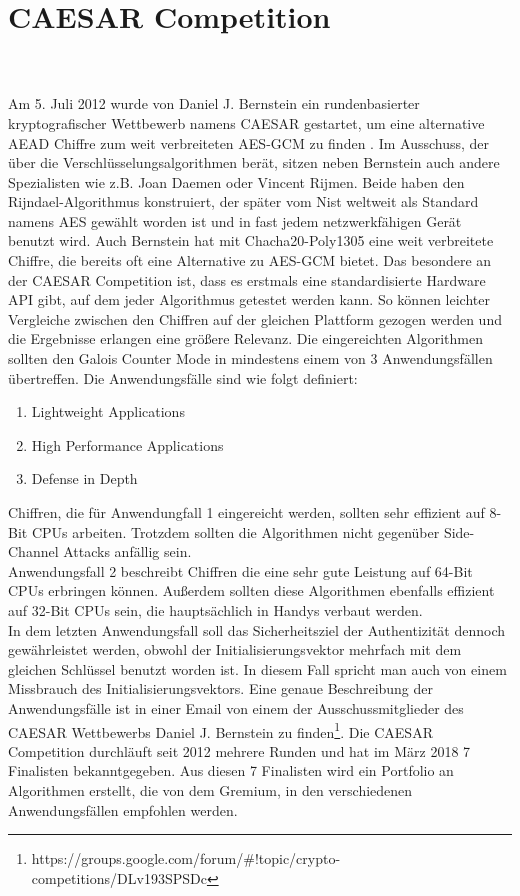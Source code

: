 \section{CAESAR Competition}\\
\\
Am 5. Juli 2012 wurde von Daniel J. Bernstein ein rundenbasierter kryptografischer Wettbewerb namens \gls{CAESAR} gestartet, um eine alternative AEAD Chiffre zum weit verbreiteten \gls{AES-GCM} zu finden \cite{bernstein2014caesar}. Im Ausschuss, der über die Verschlüsselungsalgorithmen berät, sitzen neben Bernstein auch andere Spezialisten wie z.B. Joan Daemen oder Vincent Rijmen. Beide haben den Rijndael-Algorithmus konstruiert, der später vom Nist weltweit als Standard namens \gls{AES} gewählt worden ist und in fast jedem netzwerkfähigen Gerät benutzt wird. Auch Bernstein hat mit Chacha20-Poly1305 eine weit verbreitete Chiffre, die bereits oft eine Alternative zu AES-GCM bietet. Das besondere an der CAESAR Competition ist, dass es erstmals eine standardisierte Hardware API gibt, auf dem jeder Algorithmus getestet werden kann. So können leichter Vergleiche zwischen den Chiffren auf der gleichen Plattform gezogen werden und die Ergebnisse erlangen eine größere Relevanz.
Die eingereichten Algorithmen sollten den Galois Counter Mode in mindestens einem von 3 Anwendungsfällen übertreffen.
Die Anwendungsfälle sind wie folgt definiert: 
\begin{enumerate}
\item Lightweight Applications 
\item High Performance Applications
\item Defense in Depth
\end{enumerate}
Chiffren, die für Anwendungfall 1 eingereicht werden, sollten sehr effizient auf 8-Bit \glspl{CPU} arbeiten. Trotzdem sollten die Algorithmen nicht gegenüber Side-Channel Attacks anfällig sein.\\
Anwendungsfall 2 beschreibt Chiffren die eine sehr gute Leistung auf 64-Bit \gls{CPU}s erbringen können. Außerdem sollten diese Algorithmen ebenfalls effizient auf 32-Bit CPUs sein, die hauptsächlich in Handys verbaut werden.\\
In dem letzten Anwendungsfall soll das Sicherheitsziel der Authentizität dennoch gewährleistet werden, obwohl der Initialisierungsvektor mehrfach mit dem gleichen Schlüssel benutzt worden ist. In diesem Fall spricht man auch von einem Missbrauch des Initialisierungsvektors.
Eine genaue Beschreibung der Anwendungsfälle ist in einer Email von einem der Ausschussmitglieder des \gls{CAESAR} Wettbewerbs Daniel J. Bernstein zu finden\footnote[1]{https://groups.google.com/forum/#!topic/crypto-competitions/DLv193SPSDc}.
Die \gls{CAESAR} Competition durchläuft seit 2012 mehrere Runden und hat im März 2018 7 Finalisten bekanntgegeben. Aus diesen 7 Finalisten wird ein Portfolio an Algorithmen erstellt, die von dem Gremium, in den verschiedenen Anwendungsfällen empfohlen werden.
